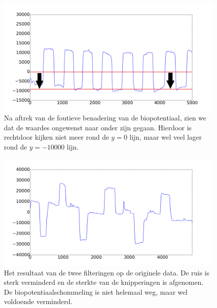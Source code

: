 \documentclass{article}
\begin{document}
\begin{figure}[h]
\centering
\includegraphics[width=\linewidth]{images/biofout}
\caption{Na aftrek van de foutieve benadering van de biopotentiaal, zien we dat de waardes ongewenst naar onder zijn gegaan. Hierdoor is rechtdoor kijken niet meer rond de $y = 0$ lijn, maar wel veel lager rond de $y = -10000$ lijn.}
\label{fig:bio_fout}
\end{figure}

\begin{figure}[h]
\centering
\includegraphics[width=\linewidth]{images/filtered_data}
\caption{Het resultaat van de twee filteringen op de originele data. De ruis is sterk verminderd en de sterkte van de knipperingen is afgenomen. De biopotentiaalschommeling is niet helemaal weg, maar wel voldoende verminderd.}
\label{fig:filtereddata}
\end{figure}
\end{document}
